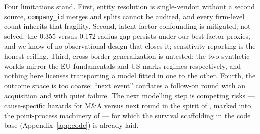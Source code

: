 Four limitations stand. First, entity resolution is single-vendor: without a second source,
\texttt{company\_id} merges and splits cannot be audited, and every firm-level count inherits that
fragility. Second, latent-factor confounding is mitigated, not solved: the 0.355-versus-0.172 radius gap
persists under our best factor proxies, and we know of no observational design that closes it; sensitivity
reporting is the honest ceiling. Third, cross-border generalization is untested: the two synthetic worlds
mirror the EU-fundamentals and US-marks regimes respectively, and nothing here licenses transporting a model
fitted in one to the other. Fourth, the outcome space is too coarse: ``next event'' conflates a follow-on
round with an acquisition and with quiet failure. The next modelling step is competing risks ---
cause-specific hazards for M\&A versus next round in the spirit of \cite{cox1972}, marked into the
point-process machinery of \cite{daley2003} --- for which the survival scaffolding in the code base
(Appendix~\ref{app:code}) is already laid.
